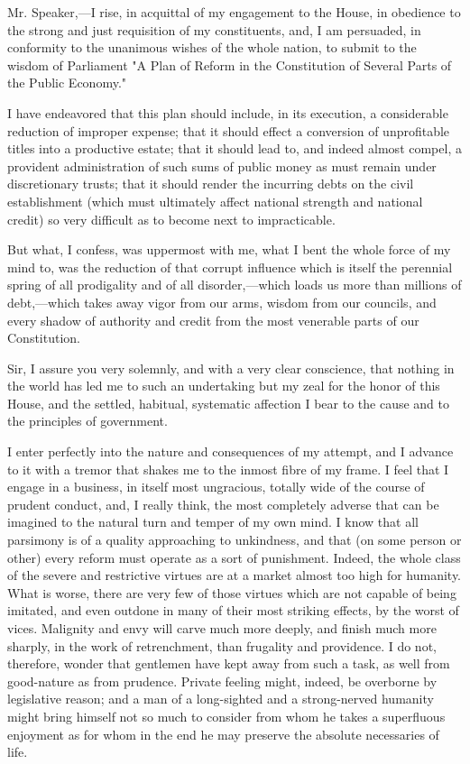 Mr. Speaker,—I rise, in acquittal of my engagement to the House, in obedience to the strong and just requisition of my constituents, and, I am persuaded, in conformity to the unanimous wishes of the whole nation, to submit to the wisdom of Parliament "A Plan of Reform in the Constitution of Several Parts of the Public Economy."

I have endeavored that this plan should include, in its execution, a considerable reduction of improper expense; that it should effect a conversion of unprofitable titles into a productive estate; that it should lead to, and indeed almost compel, a provident administration of such sums of public money as must remain under discretionary trusts; that it should render the incurring debts on the civil establishment (which must ultimately affect national strength and national credit) so very difficult as to become next to impracticable.

But what, I confess, was uppermost with me, what I bent the whole force of my mind to, was the reduction of that corrupt influence which is itself the perennial spring of all prodigality and of all disorder,—which loads us more than millions of debt,—which takes away vigor from our arms, wisdom from our councils, and every shadow of authority and credit from the most venerable parts of our Constitution.

Sir, I assure you very solemnly, and with a very clear conscience, that nothing in the world has led me to such an undertaking but my zeal for the honor of this House, and the settled, habitual, systematic affection I bear to the cause and to the principles of government.

I enter perfectly into the nature and consequences of my attempt, and I advance to it with a tremor that shakes me to the inmost fibre of my frame. I feel that I engage in a business, in itself most ungracious, totally wide of the course of prudent conduct, and, I really think, the most completely adverse that can be imagined to the natural turn and temper of my own mind. I know that all parsimony is of a quality approaching to unkindness, and that (on some person or other) every reform must operate as a sort of punishment. Indeed, the whole class of the severe and restrictive virtues are at a market almost too high for humanity. What is worse, there are very few of those virtues which are not capable of being imitated, and even outdone in many of their most striking effects, by the worst of vices. Malignity and envy will carve much more deeply, and finish much more sharply, in the work of retrenchment, than frugality and providence. I do not, therefore, wonder that gentlemen have kept away from such a task, as well from good-nature as from prudence. Private feeling might, indeed, be overborne by legislative reason; and a man of a long-sighted and a strong-nerved humanity might bring himself not so much to consider from whom he takes a superfluous enjoyment as for whom in the end he may preserve the absolute necessaries of life.

